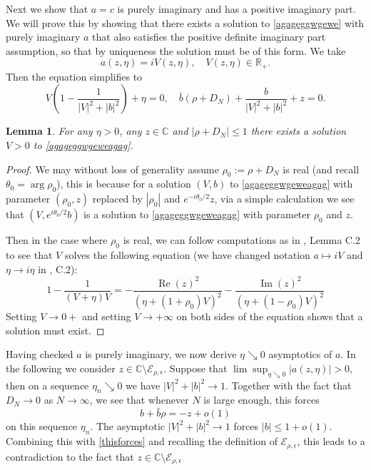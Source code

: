 \documentclass[11pt,reqno]{amsart}
\theoremstyle{plain}
\newtheorem{lemma}[theorem]{Lemma}
\theoremstyle{remark}
\numberwithin{equation}{section}
\begin{document}
Next we show that $a=c$ is purely imaginary and has a positive imaginary part. We will prove this by showing that there exists a solution to \eqref{agageggwgewe} with purely imaginary $a$ that also satisfies the positive definite imaginary part assumption, so that by uniqueness \cite{helton2007operator} the solution must be of this form. We take $$a(z,\eta)=iV(z,\eta),\quad V(z,\eta)\in\mathbb{R}_+.$$ Then the equation simplifies to 
\begin{equation}\label{agageggwgeweagag}
V(1-\frac{1}{|V|^2+|b|^2})+\eta=0,\quad \bar{b}(\rho+D_N)+\frac{b}{|V|^2+|b|^2}+z=0.
\end{equation}
\begin{lemma}
    For any $\eta>0$, any $z\in\mathbb{C}$ and $|\rho+D_N|\leq 1$ there exists a solution $V>0$ to \eqref{agageggwgeweagag}.
\end{lemma}
\begin{proof} We may without loss of generality assume $\rho_0:=\rho+D_N$ is real (and recall $\theta_0=\arg\rho_0$), this is because for a solution $(V,b)$ to \eqref{agageggwgeweagag} with parameter $(\rho_0,z)$ replaced by  $|\rho_0|$ and $e^{-i\theta_0/2}z$, via a simple calculation we see that $(V,e^{i\theta_0/2}b)$ is a solution to \eqref{agageggwgeweagag} with parameter $\rho_0$ and $z$. 

Then in the case where $\rho_0$ is real, we can follow computations as in \cite{article1221}, Lemma C.2 to see that $V$ solves the following equation (we have changed notation $a\mapsto iV$ and $\eta\to i\eta$ in \cite{article1221}, C.2):
    $$
1-\frac{1}{(V+\eta)V}=-\frac{\operatorname{Re}(z)^2}{(\eta+(1+\rho_0)V)^2}-\frac{\operatorname{Im}(z)^2}{(\eta+(1-\rho_0)V)^2}
    $$ Setting $V\to 0+$ and setting $V\to +\infty$ on both sides of the equation shows that a solution must exist.
\end{proof}

Having checked $a$ is purely imaginary, we now derive $\eta\searrow 0$ asymptotics of $a$.
In the following we consider $z\in\mathbb{C}\setminus\mathcal{E}_{\rho,\epsilon}$. Suppose that $\lim\sup_{\eta\searrow 0}|a(z,\eta)|>0$, then on a sequence $\eta_n\searrow 0$ we have $|V|^2+|b|^2\to 1$. Together with the fact that $D_N\to 0$ as $N\to \infty$, we see that whenever $N$ is large enough, this forces \begin{equation}\label{thisforces}b+\bar{b}\rho=-z+o(1)\end{equation} on this sequence $\eta_n$. The asymptotic $|V|^2+|b|^2\to 1$ forces $|b|\leq 1+o(1)$. Combining this with \eqref{thisforces} and recalling the definition of $\mathcal{E}_{\rho,\epsilon}$, this leads to a contradiction to the fact that $z\in \mathbb{C}\setminus\mathcal{E}_{\rho,\epsilon}$ 
\end{document}
